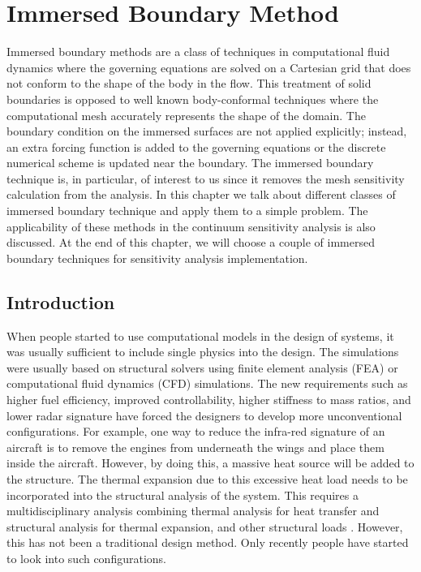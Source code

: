 \chapter{Immersed Boundary Method}\label{ch:immersedBoundary}
Immersed boundary methods are a class of techniques in computational fluid dynamics where the governing equations are solved on a Cartesian grid that does not conform to the shape of the body in the flow. This treatment of solid boundaries is opposed to well known body-conformal techniques where the computational mesh accurately represents the shape of the domain. The boundary condition on the immersed surfaces are not applied explicitly; instead, an extra forcing function is added to the governing equations or the discrete numerical scheme is updated near the boundary. The immersed boundary technique is, in particular, of interest to us since it removes the mesh sensitivity calculation from the analysis. In this chapter we talk about different classes of immersed boundary technique and apply them to a simple problem. The applicability of these methods in the continuum sensitivity analysis is also discussed. At the end of this chapter, we will choose a couple of immersed boundary techniques for sensitivity analysis implementation.

\section{Introduction}
When people started to use computational models in the design of systems, it was usually sufficient to include single physics into the design. The simulations were usually based on structural solvers using finite element analysis (FEA) or computational fluid dynamics (CFD) simulations. The new requirements such as higher fuel efficiency, improved controllability, higher stiffness to mass ratios, and lower radar signature have forced the designers to develop more unconventional configurations. For example, one way to reduce the infra-red signature of an aircraft is to remove the engines from underneath the wings and place them inside the aircraft. However, by doing this, a massive heat source will be added to the structure. The thermal expansion due to this excessive heat load needs to be incorporated into the structural analysis of the system. This requires a multidisciplinary analysis combining thermal analysis for heat transfer and structural analysis for thermal expansion, and other structural loads \cite{deaton2013stiffening}. However, this has not been a traditional design method. Only recently people have started to look into such configurations.

